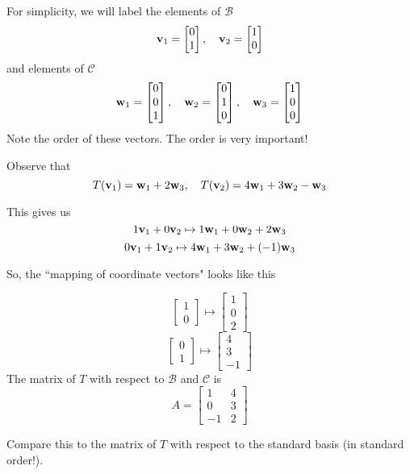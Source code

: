 \documentclass{ximera}
\renewcommand{\vec}[1]{{\bf #1}}
\begin{document}
\begin{example}
\begin{explanation}
For simplicity, we will label the elements of $\mathcal{B}$
$$\vec{v}_1=\begin{bmatrix}0\\1\end{bmatrix},\quad\vec{v}_2=\begin{bmatrix}1\\0\end{bmatrix}$$
and elements of $\mathcal{C}$
$$\vec{w}_1=\begin{bmatrix}0\\0\\1\end{bmatrix},\quad\vec{w}_2=\begin{bmatrix}0\\1\\0\end{bmatrix},\quad\vec{w}_3=\begin{bmatrix}1\\0\\0\end{bmatrix}$$
Note the order of these vectors.  The order is very important!

Observe that $$T(\vec{v}_1)=\vec{w}_1+2\vec{w}_3,\quad T(\vec{v}_2)=4\vec{w}_1+3\vec{w}_2-\vec{w}_3$$

This gives us
$$1\vec{v}_1+0\vec{v}_2\mapsto 1\vec{w}_1+0\vec{w}_2+2\vec{w}_3$$
$$0\vec{v}_1+1\vec{v}_2\mapsto 4\vec{w}_1+3\vec{w}_2+(-1)\vec{w}_3$$

So, the ``mapping of coordinate vectors" looks like this

$$\begin{bmatrix}1\\0\end{bmatrix}\mapsto\begin{bmatrix}1\\0\\2\end{bmatrix}$$
$$\begin{bmatrix}0\\1\end{bmatrix}\mapsto\begin{bmatrix}4\\3\\-1\end{bmatrix}$$
The matrix of $T$ with respect to $\mathcal{B}$ and $\mathcal{C}$ is 
$$A=\begin{bmatrix}1&4\\0&3\\-1&2\end{bmatrix}$$

Compare this to the matrix of $T$ with respect to the standard basis (in standard order!).
\end{explanation}
\end{example}
\end{document}
